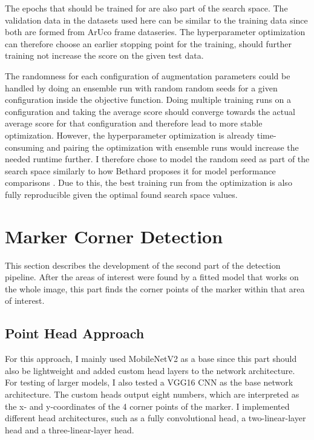\documentclass[10pt]{book}
\begin{document}
The epochs that should be trained for are also part of the search space. The validation data in the datasets used here can be similar to the training data since both are formed from \ac{ArUco} frame dataseries. The hyperparameter optimization can therefore choose an earlier stopping point for the training, should further training not increase the score on the given test data. 


The randomness for each configuration of augmentation parameters could be handled by %
doing an ensemble run with random random seeds for a given configuration inside the objective function. Doing multiple training runs on a configuration and taking the average score should converge towards the actual average score for that configuration and therefore lead to more stable optimization. However, the hyperparameter optimization is already time-consuming and pairing the optimization with ensemble runs would increase the needed runtime further. I therefore chose to model the random seed as part of the search space similarly to how Bethard proposes it for model performance comparisons \cite{bethard2022need}. Due to this, the best training run from the optimization is also fully reproducible given the optimal found search space values. 

\section{Marker Corner Detection}

This section describes the development of the second part of the detection pipeline. After the areas of interest were found by a fitted model that works on the whole image, this part finds the corner points of the marker within that area of interest.

\subsection{Point Head Approach}

For this approach, I mainly used MobileNetV2 as a base since this part should also be lightweight and added custom head layers to the network architecture. For testing of larger models, I also tested a VGG16 \ac{CNN} as the base network architecture. The custom heads output eight numbers, which are interpreted as the x- and y-coordinates of the 4 corner points of the marker. I implemented different head architectures, such as a fully convolutional head, a two-linear-layer head and a three-linear-layer head.
\end{document}
